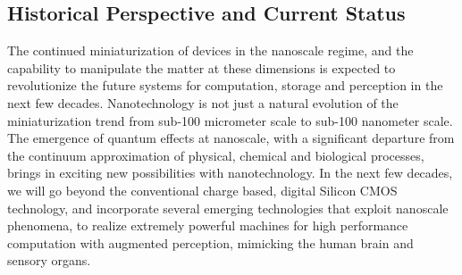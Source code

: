 \begin{multicols}{2}

\section{Historical Perspective and Current Status}

The continued miniaturization of devices in the nanoscale regime, and the capability to manipulate the matter at these dimensions is expected to revolutionize the future systems for computation, storage and perception in the next few decades. Nanotechnology is not just a natural evolution of the miniaturization trend from sub-100 micrometer scale to sub-100 nanometer scale. The emergence of quantum effects at nanoscale, with a significant departure from  the continuum approximation of physical, chemical and biological processes, brings in exciting new possibilities with nanotechnology. In the next few decades, we will go beyond the conventional charge based, digital Silicon CMOS technology, and incorporate several emerging technologies that exploit nanoscale phenomena, to realize extremely powerful machines for high performance computation with augmented perception, mimicking the human brain and sensory organs. 


\end{multicols}
